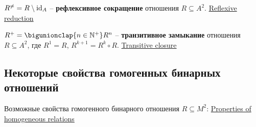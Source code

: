 \documentclass[a4paper,10pt]{article}
\begin{document}
\begin{terms}

    \item $R^{\neq} = R \setminus \mathrm{id}_{A}$ \--- \textbf{рефлексивное сокращение} отношения $R \subseteq A^2$.
    \hfill\href{https://en.wikipedia.org/wiki/Reflexive_reduction}{Reflexive reduction}


    \item $R^{+} = \bigunionclap{n \in \NaturalPlus} R^n$ \--- \textbf{транзитивное замыкание} отношения $R \subseteq A^2$, где $R^1 = R$, $R^{k+1} = R^k \circ R$.
    \hfill\href{https://en.wikipedia.org/wiki/Transitive_closure}{Transitive closure}

\end{terms}


\newpage


\subsection{Некоторые свойства гомогенных бинарных отношений}

Возможные свойства гомогенного бинарного отношения $R \subseteq M^2$:
\hfill\href{https://en.wikipedia.org/wiki/Homogeneous_relation#Properties}{Properties of homogeneous relations}
\end{document}
